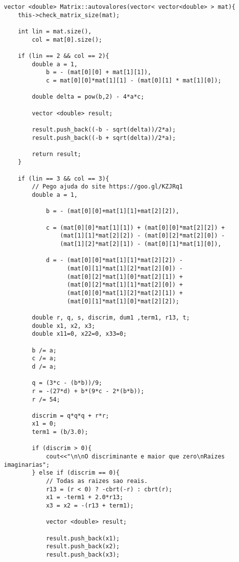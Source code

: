 \documentclass[a4paper, 11pt]{article}
\begin{document}
\begin{lstlisting}
vector <double> Matrix::autovalores(vector< vector<double> > mat){
	this->check_matrix_size(mat);
	
	int lin = mat.size(), 
		col = mat[0].size();
	
	if (lin == 2 && col == 2){
		double a = 1,
			b = - (mat[0][0] + mat[1][1]),
			c = mat[0][0]*mat[1][1] - (mat[0][1] * mat[1][0]);
			
		double delta = pow(b,2) - 4*a*c;
		
		vector <double> result;
		
		result.push_back((-b - sqrt(delta))/2*a);
		result.push_back((-b + sqrt(delta))/2*a);
		
		return result;
	}

	if (lin == 3 && col == 3){
		// Pego ajuda do site https://goo.gl/KZJRq1
		double a = 1,
        
			b = - (mat[0][0]+mat[1][1]+mat[2][2]),
            
			c = (mat[0][0]*mat[1][1]) + (mat[0][0]*mat[2][2]) + 
            	(mat[1][1]*mat[2][2]) - (mat[0][2]*mat[2][0]) - 
                (mat[1][2]*mat[2][1]) - (mat[0][1]*mat[1][0]),
                
			d = - (mat[0][0]*mat[1][1]*mat[2][2]) - 
                  (mat[0][1]*mat[1][2]*mat[2][0]) - 
                  (mat[0][2]*mat[1][0]*mat[2][1]) + 
                  (mat[0][2]*mat[1][1]*mat[2][0]) + 
                  (mat[0][0]*mat[1][2]*mat[2][1]) + 
                  (mat[0][1]*mat[1][0]*mat[2][2]);
			
		double r, q, s, discrim, dum1 ,term1, r13, t; 
	    double x1, x2, x3; 
	    double x11=0, x22=0, x33=0; 
		
		b /= a; 
	    c /= a; 
	    d /= a; 
	     
	    q = (3*c - (b*b))/9; 
	    r = -(27*d) + b*(9*c - 2*(b*b)); 
	    r /= 54; 
	      
	    discrim = q*q*q + r*r; 
	    x1 = 0;
	    term1 = (b/3.0); 
		
		if (discrim > 0){ 
	    	cout<<"\n\nO discriminante e maior que zero\nRaizes imaginarias"; 
		} else if (discrim == 0){ 
		   	// Todas as raizes sao reais. 
	       	r13 = (r < 0) ? -cbrt(-r) : cbrt(r); 
	       	x1 = -term1 + 2.0*r13; 
	       	x3 = x2 = -(r13 + term1); 
			
			vector <double> result;

			result.push_back(x1);
			result.push_back(x2);
			result.push_back(x3);
		

\end{lstlisting}
\end{document}
